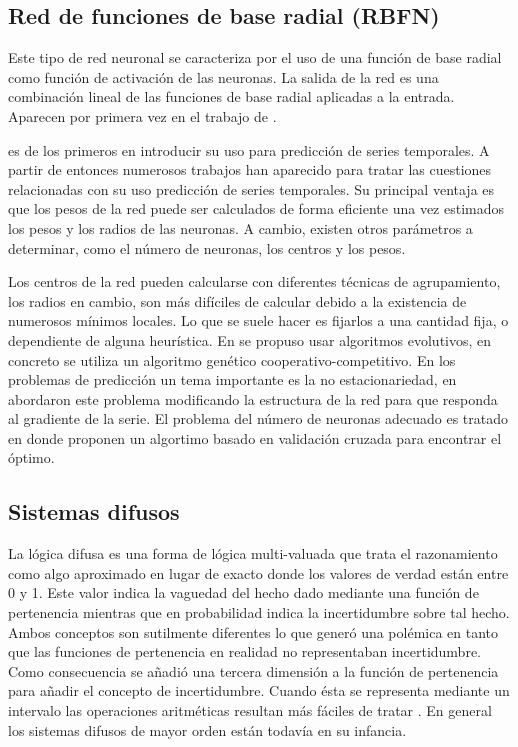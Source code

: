 \documentclass{llncs}
\begin{document}
\subsection{Red de funciones de base radial (RBFN)}
Este tipo de red neuronal se caracteriza por el uso de una función de base radial como función de activación de las neuronas. La salida de la red es una combinación lineal de las funciones de base radial aplicadas a la entrada. Aparecen por primera vez en el trabajo de \cite{broomhead1988radial}. 

\cite{chen1991orthogonal} es de los primeros en introducir su uso para predicción de series temporales. A partir de entonces numerosos trabajos han aparecido para tratar las cuestiones relacionadas con su uso predicción de series temporales. Su principal ventaja es que los pesos de la red puede ser calculados de forma eficiente una vez estimados los pesos y los radios de las neuronas. A cambio, existen otros parámetros a determinar, como el número de neuronas, los centros y los pesos.

Los centros de la red pueden calcularse con diferentes técnicas de agrupamiento, los radios en cambio, son más difíciles de calcular debido a la existencia de numerosos mínimos locales. Lo que se suele hacer es fijarlos a una cantidad fija, o dependiente de alguna heurística. En \cite{whitehead1996cooperative} se propuso usar algoritmos evolutivos, en concreto se utiliza un algoritmo genético cooperativo-competitivo. En los problemas de predicción un tema importante es la no estacionariedad, en \cite{chng1996gradient} abordaron este problema modificando la estructura de la red para que responda al gradiente de la serie. El problema del número de neuronas adecuado es tratado en \cite{leung2001prediction} donde proponen un algortimo basado en validación cruzada para encontrar el óptimo.

\subsection{Sistemas difusos}
La lógica difusa es una forma de lógica multi-valuada que trata el razonamiento como algo aproximado en lugar de exacto donde los valores de verdad están entre 0 y 1. Este valor indica la vaguedad del hecho dado mediante una función de pertenencia mientras que en probabilidad indica la incertidumbre sobre tal hecho. Ambos conceptos son sutilmente diferentes lo que generó una polémica en tanto que las funciones de pertenencia en realidad no representaban incertidumbre. Como consecuencia se añadió una tercera dimensión a la función de pertenencia para añadir el concepto de incertidumbre. Cuando ésta se representa mediante un intervalo las operaciones aritméticas resultan más fáciles de tratar \cite{liang2000interval}. En general los sistemas difusos de mayor orden están todavía en su infancia.
\end{document}
